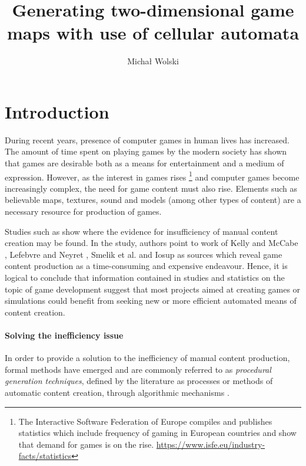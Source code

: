 \documentclass[12pt]{report}
\title{Generating two-dimensional game maps with use of cellular automata}
\author{Michał Wolski}
\begin{document}
\maketitle
\renewcommand{\contentsname}{Table of contents}
\tableofcontents  

\chapter{Introduction} \label{rozdzial.wstep} 
During recent years, presence of computer games in human lives has increased. The amount of time spent on playing games by the modern society has shown that games are desirable both as a means for entertainment and a medium of expression. However, as the interest in games rises \footnote{The Interactive Software Federation of Europe compiles and publishes statistics which include frequency of gaming in European countries and show that demand for games is on the rise. \url{https://www.isfe.eu/industry-facts/statistics}} and computer games become increasingly complex, the need for game content must also rise. Elements such as believable maps, textures, sound and models (among other types of content) are a necessary resource for production of games. 

Studies such as \autocite{hendrikx2013procedural} show where the evidence for insufficiency of manual content creation may be found. In the study, authors point to work of Kelly and McCabe \autocite{kelly2007citygen}, Lefebvre and Neyret \autocite{lefebvre2003pattern}, Smelik et al. \autocite{smelik2009survey} and Iosup \autocite{iosup2009poggi} as sources which reveal game content production as a time-consuming and expensive endeavour. Hence, it is logical to conclude that information contained in studies and statistics on the topic of game development suggest that most projects aimed at creating games or simulations could benefit from seeking new or more efficient automated means of content creation.

\subsubsection{Solving the inefficiency issue}
In order to provide a solution to the inefficiency of manual content production, formal methods have emerged and are commonly referred to as \textit{procedural generation techniques}, defined by the literature as processes or methods of automatic content creation, through algorithmic mechanisms \autocite{togelius2011search} \autocite{yannakakis2015experience}.
\end{document}
